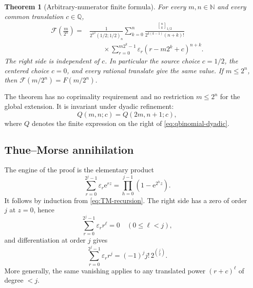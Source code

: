 \documentclass[11pt]{article}
\numberwithin{equation}{section}
\newtheorem{theorem}{Theorem}[section]
\theoremstyle{definition}
\theoremstyle{remark}
\newcommand{\Q}{\mathbb Q}
\newcommand{\N}{\mathbb N}
\newcommand{\GF}{\mathcal F}
\newcommand{\eps}{\varepsilon}
\newcommand{\e}{\mathrm e}
\newcommand{\GaussBinom}[3]{\genfrac{[}{]}{0pt}{}{#1}{#2}_{#3}}
\begin{document}
\begin{theorem}[Arbitrary-numerator finite formula]\label{thm:qbinomial-dyadic}
For every $m,n\in\N$ and every common translation $c\in\Q$,
\begin{equation}\label{eq:qbinomial-dyadic}
\boxed{
\begin{aligned}
 \GF\!\left(\frac{m}{2^n}\right)
 ={}&\frac{1}{2^{n^2}(1/2;1/2)_n}
 \sum_{k=0}^{n}
 \frac{\GaussBinom{n}{k}{1/2}}
      {2^{k(k-1)}(n+k)!}\\
 &\qquad\times
 \sum_{r=0}^{m2^k-1}\eps_r
 \left(r-m2^k+c\right)^{n+k}.
\end{aligned}}
\end{equation}
The right side is independent of $c$.  In particular the source choice $c=1/2$, the centered choice $c=0$, and every rational translate give the same value.  If $m\le2^n$, then $\GF(m/2^n)=F(m/2^n)$.
\end{theorem}

The theorem has no coprimality requirement and no restriction $m\le2^n$ for the global extension.  It is invariant under dyadic refinement:
\begin{equation}\label{eq:q-refinement-invariance}
 Q(m,n;c)=Q(2m,n+1;c),
\end{equation}
where $Q$ denotes the finite expression on the right of \eqref{eq:qbinomial-dyadic}.

\subsection{Thue--Morse annihilation}

The engine of the proof is the elementary product
\begin{equation}\label{eq:TM-exponential-product}
 \sum_{r=0}^{2^j-1}\eps_r\e^{rz}
 =\prod_{h=0}^{j-1}(1-\e^{2^h z}).
\end{equation}
It follows by induction from \eqref{eq:TM-recursion}.  The right side has a zero of order $j$ at $z=0$, hence
\begin{equation}\label{eq:TM-power-annihilation}
 \sum_{r=0}^{2^j-1}\eps_r r^\ell=0
 \quad(0\le\ell<j),
\end{equation}
and differentiation at order $j$ gives
\begin{equation}\label{eq:TM-leading-power}
 \sum_{r=0}^{2^j-1}\eps_r r^j
 =(-1)^j j!\,2^{\binom j2}.
\end{equation}
More generally, the same vanishing applies to any translated power $(r+c)^\ell$ of degree $<j$.
\end{document}
